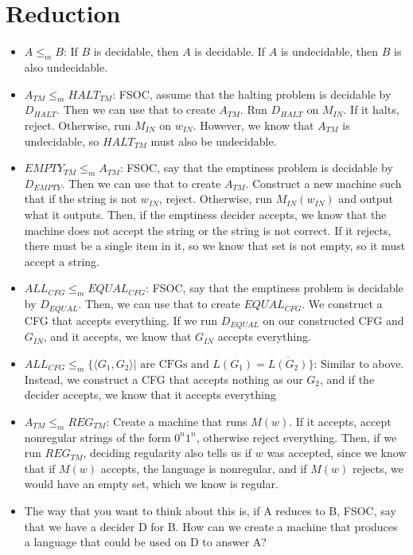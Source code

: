 \documentclass{article}
\begin{document}
\section{Reduction}
\begin{itemize}
    \item $A\leq_m B$: If $B$ is decidable, then $A$ is decidable. If $A$ is undecidable, then $B$ is also undecidable.
    \item $A_{TM} \leq_m HALT_{TM}$: FSOC, assume that the halting problem is decidable by $D_{HALT}$. Then we can use that to create $A_{TM}$. Run $D_{HALT}$ on $M_{IN}$. If it halts, reject. Otherwise, run $M_{IN}$ on $w_{IN}$. However, we know that $A_{TM}$ is undecidable, so $HALT_{TM}$ must also be undecidable.
    \item $EMPTY_{TM} \leq_m A_{TM}$: FSOC, say that the emptiness problem is decidable by $D_{EMPTY}$. Then we can use that to create $A_{TM}$. Construct a new machine such that if the string is not $w_{IN}$, reject. Otherwise, run $M_{IN}(w_{IN})$ and output what it outputs. Then, if the emptiness decider accepts, we know that the machine does not accept the string or the string is not correct. If it rejects, there must be a single item in it, so we know that set is not empty, so it must accept a string.
    \item $ALL_{CFG} \leq_m EQUAL_{CFG}$: FSOC, say that the emptiness problem is decidable by $D_{EQUAL}$. Then, we can use that to create $EQUAL_{CFG}$. We construct a CFG that accepts everything. If we run $D_{EQUAL}$ on our constructed CFG and $G_{IN}$, and it accepts, we know that $G_{IN}$ accepts everything.
    \item $ALL_{CFG}\leq_m \{\langle G_1, G_2\rangle | \textrm { are CFGs and } L(G_1)=\overline{L(G_2)}\}$: Similar to above. Instead, we construct a CFG that accepts nothing as our $G_2$, and if the decider accepts, we know that it accepts everything
    \item $A_{TM} \leq_m REG_{TM}$: Create a machine that runs $M(w)$. If it accepts, accept nonregular strings of the form $0^{n}1^{n}$, otherwise reject everything. Then, if we run $REG_{TM}$, deciding regularity also tells us if $w$ was accepted, since we know that if $M(w)$ accepts, the language is nonregular, and if $M(w)$ rejects, we would have an empty set, which we know is regular.
    \item The way that you want to think about this is, if A reduces to B, FSOC, say that we have a decider D for B. How can we create a machine that produces a language that could be used on D to answer A?
\end{itemize}
\end{document}
